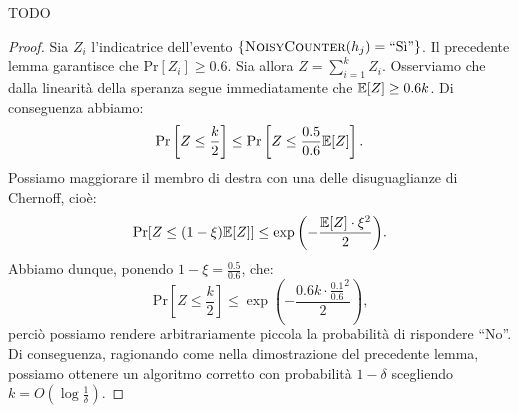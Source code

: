 \begin{lemma}
  TODO
\end{lemma}
\begin{proof}
  Sia \(Z_i\) l'indicatrice dell'evento \(\{\textsc{NoisyCounter}(h_j)=\mbox{``S\`i''}\}\).
  Il precedente lemma garantisce che \(\mbox{Pr}[Z_i]\ge 0.6\). Sia allora \(Z=
  \sum_{i=1}^k{Z_i}\). Osserviamo che dalla linearit\`a della speranza segue 
  immediatamente che \(\mathbb{E}[Z]\ge 0.6k\). Di conseguenza abbiamo:
  \[\mbox{Pr}\left[Z\le\frac{k}{2}\right]\le\mbox{Pr}\left[Z\le\frac{0.5}{0.6}
  \mathbb{E}[Z]\right]\mbox{.}\]
  Possiamo maggiorare il membro di destra con una delle disuguaglianze di
  Chernoff, cio\`e:
  \[\mbox{Pr}[Z\le(1-\xi)\mathbb{E}[Z]]\le\exp{\left(-\frac{\mathbb{E}[Z]\cdot\xi^2}{2}\right)}\mbox{.}\]
  Abbiamo dunque, ponendo \(1-\xi = \frac{0.5}{0.6}\), che:
  \[\mbox{Pr}\left[Z\le\frac{k}{2}\right]\le\exp{\left(-\frac{0.6 k\cdot{\frac{0.1}{0.6}}^2}{2}\right)}\mbox{,}\]
  perci\`o possiamo rendere arbitrariamente  piccola la probabilit\`a di rispondere
  ``No''. Di conseguenza, ragionando come nella dimostrazione del precedente lemma,
  possiamo ottenere un algoritmo corretto con probabilit\`a \(1-\delta\) scegliendo
  \(k = O\left(\log{\frac{1}{\delta}}\right)\).
\end{proof}

